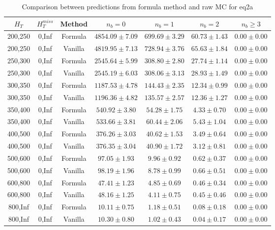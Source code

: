 \begin{longtable}{ | c | c | c | c | c | c | c | }
\caption{Comparison between predictions from formula method and raw MC for eq2a} \label{tab:formula-eq2a} \\    \hline 
$H_{T}$ & $H_{T}^{miss}$ & Method & $n_{b} = 0$ & $n_{b} = 1$ & $n_{b} = 2$ & $n_{b} \ge 3$ \\ \hline200,250 & 0,Inf & Formula  & $  4854.09 \pm  7.09 $ & $   699.69 \pm  3.29 $ & $    60.73 \pm  1.43 $ & $     0.00 \pm  0.00 $  \\  
200,250 & 0,Inf & Vanilla  & $  4819.95 \pm  7.13 $ & $   728.94 \pm  3.76 $ & $    65.63 \pm  1.84 $ & $     0.00 \pm  0.00 $  \\ \hline 
250,300 & 0,Inf & Formula  & $  2545.64 \pm  5.99 $ & $   308.80 \pm  2.80 $ & $    27.74 \pm  1.14 $ & $     0.00 \pm  0.00 $  \\  
250,300 & 0,Inf & Vanilla  & $  2545.19 \pm  6.03 $ & $   308.06 \pm  3.13 $ & $    28.93 \pm  1.49 $ & $     0.00 \pm  0.00 $  \\ \hline 
300,350 & 0,Inf & Formula  & $  1187.53 \pm  4.78 $ & $   144.43 \pm  2.35 $ & $    12.34 \pm  0.99 $ & $     0.00 \pm  0.00 $  \\  
300,350 & 0,Inf & Vanilla  & $  1196.36 \pm  4.82 $ & $   135.57 \pm  2.57 $ & $    12.36 \pm  1.27 $ & $     0.00 \pm  0.00 $  \\ \hline 
350,400 & 0,Inf & Formula  & $   540.92 \pm  3.80 $ & $    54.28 \pm  1.75 $ & $     4.33 \pm  0.70 $ & $     0.00 \pm  0.00 $  \\  
350,400 & 0,Inf & Vanilla  & $   533.66 \pm  3.81 $ & $    60.44 \pm  2.06 $ & $     5.43 \pm  1.04 $ & $     0.00 \pm  0.00 $  \\ \hline 
400,500 & 0,Inf & Formula  & $   376.26 \pm  3.03 $ & $    40.62 \pm  1.53 $ & $     3.49 \pm  0.64 $ & $     0.00 \pm  0.00 $  \\  
400,500 & 0,Inf & Vanilla  & $   376.35 \pm  3.04 $ & $    40.90 \pm  1.72 $ & $     3.12 \pm  0.81 $ & $     0.00 \pm  0.00 $  \\ \hline 
500,600 & 0,Inf & Formula  & $    97.05 \pm  1.93 $ & $     9.96 \pm  0.92 $ & $     0.62 \pm  0.37 $ & $     0.00 \pm  0.00 $  \\  
500,600 & 0,Inf & Vanilla  & $    98.19 \pm  1.96 $ & $     8.78 \pm  0.99 $ & $     0.66 \pm  0.51 $ & $     0.00 \pm  0.00 $  \\ \hline 
600,800 & 0,Inf & Formula  & $    47.41 \pm  1.23 $ & $     4.85 \pm  0.69 $ & $     0.46 \pm  0.34 $ & $     0.00 \pm  0.00 $  \\  
600,800 & 0,Inf & Vanilla  & $    48.16 \pm  1.25 $ & $     4.11 \pm  0.75 $ & $     0.45 \pm  0.46 $ & $     0.00 \pm  0.00 $  \\ \hline 
800,Inf & 0,Inf & Formula  & $    10.11 \pm  0.75 $ & $     1.18 \pm  0.51 $ & $     0.08 \pm  0.18 $ & $     0.00 \pm  0.00 $  \\  
800,Inf & 0,Inf & Vanilla  & $    10.30 \pm  0.80 $ & $     1.02 \pm  0.43 $ & $     0.04 \pm  0.17 $ & $     0.00 \pm  0.00 $  \\ \hline 
    \hline 
    \hline 
\end{longtable}
